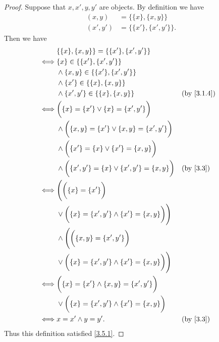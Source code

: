 \begin{proof}
  Suppose that \(x, x', y, y'\) are objects.
  By definition we have
  \begin{align*}
    (x, y)   & = \{\{x\}, \{x, y\}\}     \\
    (x', y') & = \{\{x'\}, \{x', y'\}\}.
  \end{align*}
  Then we have
  \begin{align*}
         & \{\{x\}, \{x, y\}\} = \{\{x'\}, \{x', y'\}\}                                                    \\
    \iff & \{x\} \in \{\{x'\}, \{x', y'\}\}                                                                \\
         & \land \{x, y\} \in \{\{x'\}, \{x', y'\}\}                                                       \\
         & \land \{x'\} \in \{\{x\}, \{x, y\}\}                                                            \\
         & \land \{x', y'\} \in \{\{x\}, \{x, y\}\}                          &  & \text{(by \cref{3.1.4})} \\
    \iff & \bigg(\{x\} = \{x'\} \lor \{x\} = \{x', y'\}\bigg)                                              \\
         & \land \bigg(\{x, y\} = \{x'\} \lor \{x, y\} = \{x', y'\}\bigg)                                  \\
         & \land \bigg(\{x'\} = \{x\} \lor \{x'\} = \{x, y\}\bigg)                                         \\
         & \land \bigg(\{x', y'\} = \{x\} \lor \{x', y'\} = \{x, y\}\bigg)   &  & \text{(by \cref{3.3})}   \\
    \iff & \Bigg(\bigg(\{x\} = \{x'\}\bigg)                                                                \\
         & \lor \bigg(\{x\} = \{x', y'\} \land \{x'\} = \{x, y\}\bigg)\Bigg)                               \\
         & \land \Bigg(\bigg(\{x, y\} = \{x', y'\}\bigg)                                                   \\
         & \lor \bigg(\{x\} = \{x', y'\} \land \{x'\} = \{x, y\}\bigg)\Bigg)                               \\
    \iff & \bigg(\{x\} = \{x'\} \land \{x, y\} = \{x', y'\}\bigg)                                          \\
         & \lor \bigg(\{x\} = \{x', y'\} \land \{x'\} = \{x, y\}\bigg)                                     \\
    \iff & x = x' \land y = y'.                                              &  & \text{(by \cref{3.3})}
  \end{align*}
  Thus this definition satisfied \cref{3.5.1}.


\end{proof}
